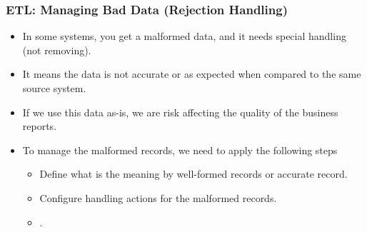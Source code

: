 
\begin{frame}
	\frametitle{ETL: Managing Bad Data (Rejection Handling)}
	\begin{itemize}
		\item In some systems, you get a malformed data, and it needs special handling (not removing).
		\item It means the data is not accurate or as expected when compared to the same source system.
		\item If we use this data as-is, we are risk affecting the quality of the business reports.
		\item To manage the malformed records, we need to apply the following steps
		\begin{itemize}
			\item  Define what is the meaning by well-formed records or accurate record.
			\item  Configure handling actions for the malformed records.
			\item  {}.

		\end{itemize}
	\end{itemize}
\end{frame}

